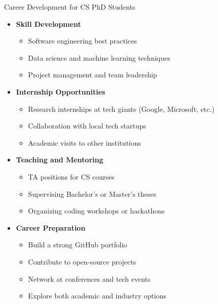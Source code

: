 \documentclass[aspectratio=169,10pt]{beamer}
\begin{document}
\begin{frame}{Career Development for CS PhD Students}
\begin{itemize}
    \item \textbf{Skill Development}
    \begin{itemize}
        \item Software engineering best practices
        \item Data science and machine learning techniques
        \item Project management and team leadership
    \end{itemize}
    \item \textbf{Internship Opportunities}
    \begin{itemize}
        \item Research internships at tech giants (Google, Microsoft, etc.)
        \item Collaboration with local tech startups
        \item Academic visits to other institutions
    \end{itemize}
    \item \textbf{Teaching and Mentoring}
    \begin{itemize}
        \item TA positions for CS courses
        \item Supervising Bachelor's or Master's theses
        \item Organizing coding workshops or hackathons
    \end{itemize}
    \item \textbf{Career Preparation}
    \begin{itemize}
        \item Build a strong GitHub portfolio
        \item Contribute to open-source projects
        \item Network at conferences and tech events
        \item Explore both academic and industry options
    \end{itemize}
\end{itemize}
\end{frame}
\end{document}
